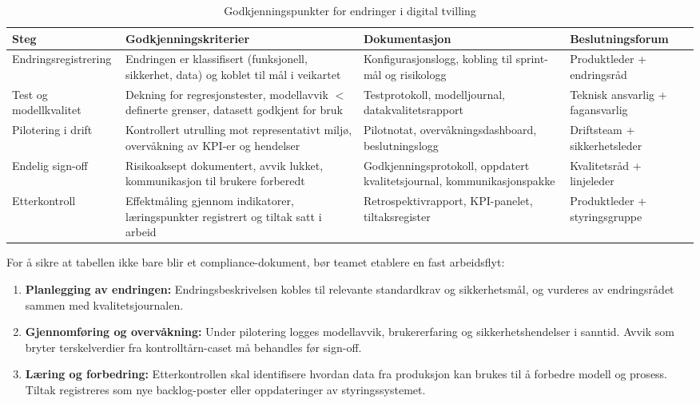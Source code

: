 \begin{table}[ht]
    \centering
    \caption{Godkjenningspunkter for endringer i digital tvilling}
    \label{tab:driftsgodkjenning}
    \begin{tabular}{|p{3.0cm}|p{4.8cm}|p{4.8cm}|p{3.0cm}|}
        \hline
        \textbf{Steg} & \textbf{Godkjenningskriterier} & \textbf{Dokumentasjon} & \textbf{Beslutningsforum} \\
        \hline
        Endringsregistrering & Endringen er klassifisert (funksjonell, sikkerhet, data) og koblet til mål i veikartet & Konfigurasjonslogg, kobling til sprint-mål og risikologg & Produktleder + endringsråd \\
        \hline
        Test og modellkvalitet & Dekning for regresjonstester, modellavvik \(<\) definerte grenser, datasett godkjent for bruk & Testprotokoll, modelljournal, datakvalitetsrapport & Teknisk ansvarlig + fagansvarlig \\
        \hline
        Pilotering i drift & Kontrollert utrulling mot representativt miljø, overvåkning av KPI-er og hendelser & Pilotnotat, overvåkningsdashboard, beslutningslogg & Driftsteam + sikkerhetsleder \\
        \hline
        Endelig sign-off & Risikoaksept dokumentert, avvik lukket, kommunikasjon til brukere forberedt & Godkjenningsprotokoll, oppdatert kvalitetsjournal, kommunikasjonspakke & Kvalitetsråd + linjeleder \\
        \hline
        Etterkontroll & Effektmåling gjennom indikatorer, læringspunkter registrert og tiltak satt i arbeid & Retrospektivrapport, KPI-panelet, tiltaksregister & Produktleder + styringsgruppe \\
        \hline
    \end{tabular}
\end{table}

For å sikre at tabellen ikke bare blir et compliance-dokument, bør teamet etablere en fast arbeidsflyt:
\begin{enumerate}
    \item \textbf{Planlegging av endringen:} Endringsbeskrivelsen kobles til relevante standardkrav og sikkerhetsmål, og vurderes av endringsrådet sammen med kvalitetsjournalen.
    \item \textbf{Gjennomføring og overvåkning:} Under pilotering logges modellavvik, brukererfaring og sikkerhetshendelser i sanntid. Avvik som bryter terskelverdier fra kontrolltårn-caset må behandles før sign-off.
    \item \textbf{Læring og forbedring:} Etterkontrollen skal identifisere hvordan data fra produksjon kan brukes til å forbedre modell og prosess. Tiltak registreres som nye backlog-poster eller oppdateringer av styringssystemet.
\end{enumerate}


